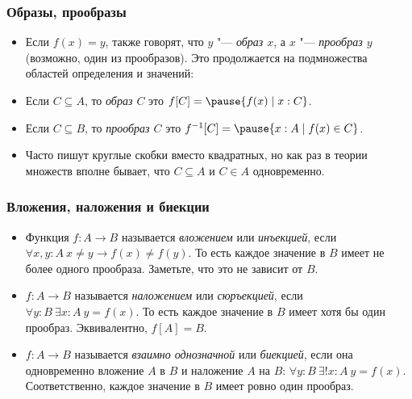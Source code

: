\documentclass[10pt]{beamer}
\begin{document}
\begin{frame}
    \frametitle{Образы, прообразы}
    \begin{itemize}
        \item Если $f(x) = y$, также говорят, что $y$ "--- \emph{образ $x$}, а $x$ "--- \emph{прообраз $y$} (возможно, один из прообразов). Это продолжается на подмножества областей определения и значений: 
        \item Если $C \subseteq A$, то \emph{образ $C$} это $f[C] = \pause \{f(x) \mid x : C\}$.
        \pause
        \item Если $C \subseteq B$, то \emph{прообраз $C$} это $f^{-1}[C] = \pause \{x : A \mid f(x) \in C\}$.
        \item Часто пишут круглые скобки вместо квадратных, но как раз в теории множеств вполне бывает, что $C \subseteq A$ и $C \in A$ одновременно.
    \end{itemize}
\end{frame}

\begin{frame}
    \frametitle{Вложения, наложения и биекции}
    \begin{itemize}
        \item Функция $f: A \to B$ называется \emph{вложением} или \emph{инъекцией}, если $\forall x,y:A~x \neq y \to f(x) \neq f(y)$. То есть каждое значение в $B$ имеет не более одного прообраза. Заметьте, что это не зависит от $B$.
        \item $f: A \to B$ называется \emph{наложением} или \emph{сюръекцией}, если $\forall y:B~ \exists x:A ~ y=f(x)$. То есть каждое значение в $B$ имеет хотя бы один прообраз. Эквивалентно, $f[A] = B$.
        \item $f: A \to B$ называется \emph{взаимно однозначной} или \emph{биекцией}, если она одновременно вложение $A$ в $B$ и наложение $A$ на $B$: $\forall y:B~ \exists ! x:A ~ y=f(x)$. Соответственно, каждое значение в $B$ имеет ровно один прообраз.
    \end{itemize}
\end{frame}
\end{document}
